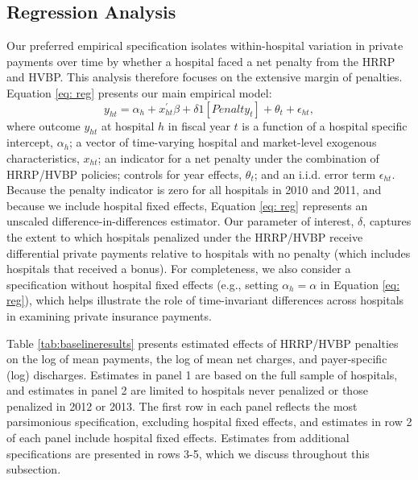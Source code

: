 \documentclass[12pt]{article}
\begin{document}
\subsection{Regression Analysis}
\label{sec:initial}
Our preferred empirical specification isolates within-hospital variation in private payments over time by whether a hospital faced a net penalty from the HRRP and HVBP. This analysis therefore focuses on the extensive margin of penalties.  Equation \ref{eq: reg} presents our main empirical model:
\begin{equation}
\label{eq: reg}
y_{ht} = \alpha_{h} + x^{'}_{ht}\beta + \delta1[Penalty_{t}]  + \theta_{t}  +  \epsilon_{ht},
\end{equation}
where outcome $y_{ht}$ at hospital $h$ in fiscal year $t$ is a function of a hospital specific intercept, $\alpha_{h}$; a vector of time-varying hospital and market-level exogenous characteristics, $x_{ht}$; an indicator for a net penalty under the combination of HRRP/HVBP policies; controls for year effects, $\theta_t$; and an i.i.d. error term $\epsilon_{ht}$.  Because the penalty indicator is zero for all hospitals in 2010 and 2011, and because we include hospital fixed effects, Equation \ref{eq: reg} represents an unscaled difference-in-differences estimator. Our parameter of interest, $\delta$, captures the extent to which hospitals penalized under the HRRP/HVBP receive differential private payments relative to hospitals with no penalty (which includes hospitals that received a bonus). For completeness, we also consider a specification without hospital fixed effects (e.g., setting $\alpha_{h}=\alpha$ in Equation \ref{eq: reg}), which helps illustrate the role of time-invariant differences across hospitals in examining private insurance payments.

Table \ref{tab:baselineresults} presents estimated effects of HRRP/HVBP penalties on the log of mean payments, the log of mean net charges, and payer-specific (log) discharges. Estimates in panel 1 are based on the full sample of hospitals, and estimates in panel 2 are limited to hospitals never penalized or those penalized in 2012 or 2013. The first row in each panel reflects the most parsimonious specification, excluding hospital fixed effects, and estimates in row 2 of each panel include hospital fixed effects. Estimates from additional specifications are presented in rows 3-5, which we discuss throughout this subsection.
\end{document}
